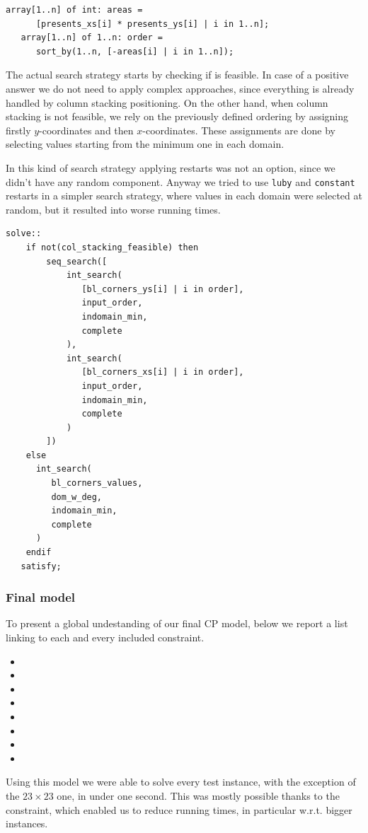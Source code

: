 \documentclass[a4paper,10pt]{article}
\begin{document}
\begin{Verbatim}[samepage=true]
   array[1..n] of int: areas =
      [presents_xs[i] * presents_ys[i] | i in 1..n];
   array[1..n] of 1..n: order =
      sort_by(1..n, [-areas[i] | i in 1..n]);
\end{Verbatim}

The actual search strategy starts by checking if  is feasible. In case of a positive answer we do not need to apply complex approaches, since everything is already handled by column stacking positioning. On the other hand, when column stacking is not feasible, we rely on the previously defined ordering by assigning firstly $y$-coordinates and then $x$-coordinates. These assignments are done by selecting values starting from the minimum one in each domain.

In this kind of search strategy applying restarts was not an option, since we didn't have any random component. Anyway we tried to use \texttt{luby} and \texttt{constant} restarts in a simpler search strategy, where values in each domain were selected at random, but it resulted into worse running times.

\begin{Verbatim}[samepage=true]
   solve::
    if not(col_stacking_feasible) then
        seq_search([
            int_search(
               [bl_corners_ys[i] | i in order],
               input_order,
               indomain_min,
               complete
            ),
            int_search(
               [bl_corners_xs[i] | i in order],
               input_order,
               indomain_min,
               complete
            )
        ])
    else
      int_search(
         bl_corners_values,
         dom_w_deg,
         indomain_min,
         complete
      )
    endif
   satisfy;
\end{Verbatim}

\subsubsection{Final model}
To present a global undestanding of our final CP model, below we report a list linking to each and every included constraint.
\begin{itemize}
   \item {}
   \item {}
   \item {}
   \item {}
   \item {}
   \item {}
   \item {}
   \item {}
\end{itemize}
Using this model we were able to solve every test instance, with the exception of the $23\times23$ one, in under one second. This was mostly possible thanks to the  constraint, which enabled us to reduce running times, in particular w.r.t. bigger instances.
\end{document}

